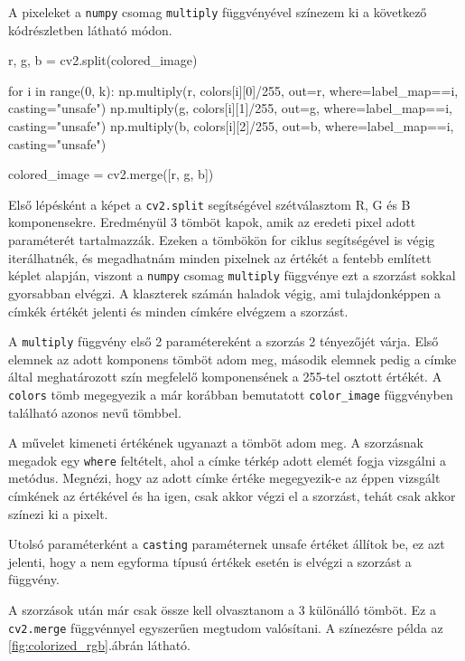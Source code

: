 A pixeleket a \texttt{numpy} csomag \texttt{multiply} függvényével színezem ki a következő kódrészletben látható módon.

\begin{python}
r, g, b = cv2.split(colored_image)

for i in range(0, k):
    np.multiply(r, colors[i][0]/255, out=r,
                where=label_map==i, casting="unsafe")
    np.multiply(g, colors[i][1]/255, out=g,
                where=label_map==i, casting="unsafe")
    np.multiply(b, colors[i][2]/255, out=b,
                where=label_map==i, casting="unsafe")

colored_image = cv2.merge([r, g, b])
\end{python}

Első lépésként a képet a \texttt{cv2.split} segítségével szétválasztom R, G és B komponensekre. Eredményül 3 tömböt kapok, amik az eredeti pixel adott paraméterét tartalmazzák. Ezeken a tömbökön for ciklus segítségével is végig iterálhatnék, és megadhatnám minden pixelnek az értékét a fentebb említett képlet alapján, viszont a \texttt{numpy} csomag \texttt{multiply} függvénye ezt a szorzást sokkal gyorsabban elvégzi. A klaszterek számán haladok végig, ami tulajdonképpen a címkék értékét jelenti és minden címkére elvégzem a szorzást.

A \texttt{multiply} függvény első 2 paramétereként a szorzás 2 tényezőjét várja. Első elemnek az adott komponens tömböt adom meg, második elemnek pedig a címke által meghatározott szín megfelelő komponensének a 255-tel osztott értékét. A \texttt{colors} tömb megegyezik a már korábban bemutatott \texttt{color\_image} függvényben található azonos nevű tömbbel.

A művelet kimeneti értékének ugyanazt a tömböt adom meg. A szorzásnak megadok egy \texttt{where} feltételt, ahol a címke térkép adott elemét fogja vizsgálni a metódus. Megnézi, hogy az adott címke értéke megegyezik-e az éppen vizsgált címkének az értékével és ha igen, csak akkor végzi el a szorzást, tehát csak akkor színezi ki a pixelt.

Utolsó paraméterként a \texttt{casting} paraméternek unsafe értéket állítok be, ez azt jelenti, hogy a nem egyforma típusú értékek esetén is elvégzi a szorzást a függvény.

A szorzások után már csak össze kell olvasztanom a 3 különálló tömböt. Ez a \texttt{cv2.merge} függvénnyel egyszerűen megtudom valósítani. A színezésre példa az \ref{fig:colorized_rgb}.ábrán látható.

